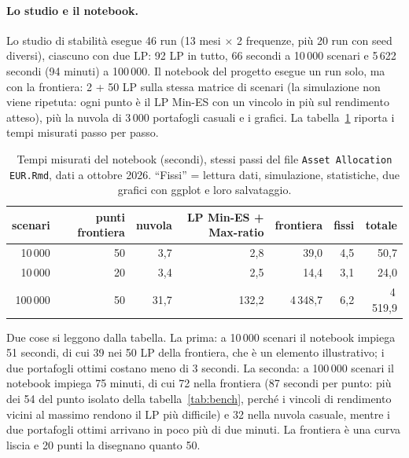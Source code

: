 \documentclass[11pt,a4paper]{article}
\newcommand{\nbTenFifty}{51}
\begin{document}
\paragraph{Lo studio e il notebook.} Lo studio di stabilit\`a esegue 46 run (13 mesi $\times$ 2 frequenze, pi\`u 20 run con seed diversi), ciascuno con due LP: 92 LP in tutto, 66 secondi a 10\,000 scenari e 5\,622 secondi (94 minuti) a 100\,000. Il notebook del progetto esegue un run solo, ma con la frontiera: 2 + 50 LP sulla stessa matrice di scenari (la simulazione non viene ripetuta: ogni punto \`e il LP Min-ES con un vincolo in pi\`u sul rendimento atteso), pi\`u la nuvola di 3\,000 portafogli casuali e i grafici. La tabella~\ref{tab:notebook} riporta i tempi misurati passo per passo.

\begin{table}[htbp]\centering\small
\caption{Tempi misurati del notebook (secondi), stessi passi del file \texttt{Asset Allocation EUR.Rmd}, dati a ottobre 2026. ``Fissi'' = lettura dati, simulazione, statistiche, due grafici con ggplot e loro salvataggio.}\label{tab:notebook}
\begin{tabular}{rrrrrrr}\toprule
scenari & punti frontiera & nuvola & LP Min-ES + Max-ratio & frontiera & fissi & totale \\ \midrule
10\,000 & 50 & 3,7 & 2,8 & 39,0 & 4,5 & 50,7 \\
10\,000 & 20 & 3,4 & 2,5 & 14,4 & 3,1 & 24,0 \\
100\,000 & 50 & 31,7 & 132,2 & 4\,348,7 & 6,2 & 4\,519,9 \\
\bottomrule\end{tabular}
\end{table}

Due cose si leggono dalla tabella. La prima: a 10\,000 scenari il notebook impiega \nbTenFifty{} secondi, di cui 39 nei 50 LP della frontiera, che \`e un elemento illustrativo; i due portafogli ottimi costano meno di 3 secondi. La seconda: a 100\,000 scenari il notebook impiega 75 minuti, di cui 72 nella frontiera (87 secondi per punto: pi\`u dei 54 del punto isolato della tabella~\ref{tab:bench}, perch\'e i vincoli di rendimento vicini al massimo rendono il LP pi\`u difficile) e 32 nella nuvola casuale, mentre i due portafogli ottimi arrivano in poco pi\`u di due minuti. La frontiera \`e una curva liscia e 20 punti la disegnano quanto 50.
\end{document}
